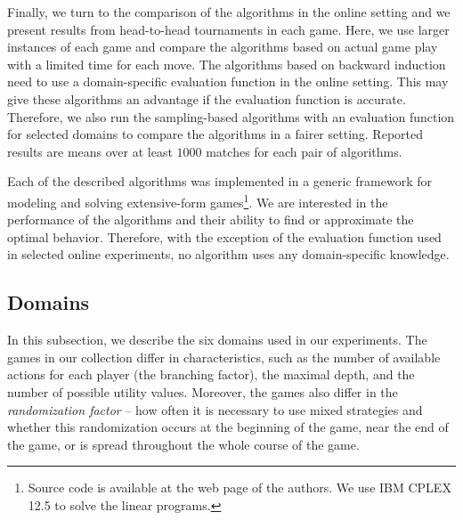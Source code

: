 Finally, we turn to the comparison of the algorithms in the online setting and we present results from head-to-head tournaments in each game.
Here, we use larger instances of each game and compare the algorithms based on actual game play with a limited time for each move. 
The algorithms based on backward induction need to use a domain-specific evaluation function in the online setting.
This may give these algorithms an advantage if the evaluation function is accurate.
Therefore, we also run the sampling-based algorithms with an evaluation function for selected domains to compare the algorithms in a fairer setting.
Reported results are means over at least $1000$ matches for each pair of algorithms.

Each of the described algorithms was implemented in a generic framework for modeling and solving extensive-form games\footnote{Source code is available at the web page of the authors. %
We use IBM CPLEX 12.5 to solve the linear programs.}.
We are interested in the performance of the algorithms and their ability to find or approximate the optimal behavior.
Therefore, with the exception of the evaluation function used in selected online experiments, no algorithm uses any domain-specific knowledge.


\subsection{Domains}\label{sec:eval:domains}

In this subsection, we describe the six domains used in our experiments.
The games in our collection differ in characteristics, such as the number of available actions for each player (\ie the branching factor), the maximal depth, and the number of possible utility values.
Moreover, the games also differ in the \emph{randomization factor} -- \ie how often it is necessary to use mixed strategies and whether this randomization occurs at the beginning of the game, near the end of the game, or is spread throughout the whole course of the game.


